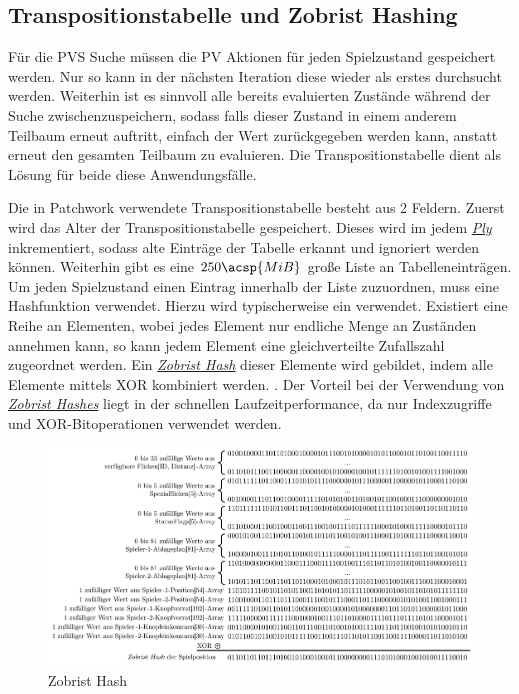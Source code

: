 \subsection{Transpositionstabelle und Zobrist Hashing}

Für die \ac{PVS} Suche müssen die \ac{PV} Aktionen für jeden Spielzustand gespeichert werden. Nur so kann in der nächsten Iteration diese wieder als erstes durchsucht werden. Weiterhin ist es sinnvoll alle bereits evaluierten Zustände während der Suche zwischenzuspeichern, sodass falls dieser Zustand in einem anderem Teilbaum erneut auftritt, einfach der Wert zurückgegeben werden kann, anstatt erneut den gesamten Teilbaum zu evaluieren. Die Transpositionstabelle dient als Lösung für beide diese Anwendungsfälle.

Die in Patchwork verwendete Transpositionstabelle besteht aus 2 Feldern. Zuerst wird das Alter der Transpositionstabelle gespeichert. Dieses wird im jedem \hyperref[text:ply]{\emph{Ply}} inkrementiert, sodass alte Einträge der Tabelle erkannt und ignoriert werden können. Weiterhin gibt es eine $250 \acsp{MiB}$ große Liste an Tabelleneinträgen. Um jeden Spielzustand einen Eintrag innerhalb der Liste zuzuordnen, muss eine Hashfunktion verwendet. Hierzu wird typischerweise ein  verwendet. Existiert eine Reihe an Elementen, wobei jedes Element nur endliche Menge an Zuständen annehmen kann, so kann jedem Element eine gleichverteilte Zufallszahl zugeordnet werden. Ein \hyperref[text:zobrist-hash]{\emph{Zobrist Hash}} dieser Elemente wird gebildet, indem alle Elemente mittels \ac{XOR} kombiniert werden. \cite[S. 3]{1990.ZobristHash}. Der Vorteil bei der Verwendung von \hyperref[text:zobrist-hash]{\emph{Zobrist Hashes}}  liegt in der schnellen Laufzeitperformance, da nur Indexzugriffe und \ac{XOR}-Bitoperationen verwendet werden.

\vspace*{-0.09cm}

\begin{figure}[!ht]
    \centering
    \includegraphics[width=\textwidth]{res/pictures/zobrist-hash.pdf}
    \vspace*{-0.35cm}
    \caption{Zobrist Hash}
    \label{fig:zobrist-hash}
\end{figure}

